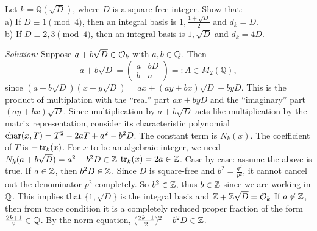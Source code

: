 \begin{outline}
    
    \begin{exercise}
        Let $k = \mathbb{Q}(\sqrt{D})$, where $D$ is a square-free integer. Show that:\\
        a) If $D \equiv 1 \pmod{4}$, then an integral basis is ${1, \frac{1+\sqrt{D}}{2}}$ and $d_k = D$.\\
        b) If $D \equiv 2,3 \pmod{4}$, then an integral basis is ${1, \sqrt{D}}$ and $d_k = 4D$.
    \end{exercise}
    \textit{Solution:} 
        \1 Suppose $a+b\sqrt{D} \in \mathcal{O}_k$ with $a,b\in \mathbb{Q}$. Then 
        $$a + b\sqrt{D} = \begin{pmatrix} a & bD \\ b & a \end{pmatrix} =:A\in M_2(\mathbb{Q}),$$
        since $(a+b\sqrt{D})(x+y\sqrt{D})=ax+(ay+bx)\sqrt{D}+byD$. This is the product of multiplation with the \enquote{real} part $ax+byD$ and the \enquote{imaginary} part $(ay+bx)\sqrt{D}$. 
        \1 Since multiplication by $a+b\sqrt{D}$ acts like multiplication by the matrix representation, consider its characteristic polynomial $\operatorname{char}(x,T)=T^2-2aT+a^2-b^2D$.
            \2 The constant term is $N_k(x)$.
            \2 The coefficient of $T$ is $-\operatorname{tr}_k(x)$.
        \1 For $x$ to be an algebraic integer, we need 
            \2 $N_k(a+b\sqrt{D})=a^2-b^2D\in \mathbb{Z}$ 
            \2 $\operatorname{tr}_k(x)=2a\in \mathbb{Z}$.
        \1 Case-by-case: assume the above is true.
            \2 If $a\in\mathbb{Z}$, then $b^2D \in\mathbb{Z}$. Since $D$ is square-free and $b^2=\frac{q^2}{p^2}$, it cannot cancel out the denominator $p^2$ completely. So $b^2 \in \mathbb{Z}$, thus $b\in\mathbb{Z}$ since we are working in $\mathbb{Q}$. This implies that $\{1,\sqrt{D}\}$ is the integral basis and $\mathbb{Z} + \mathbb{Z}\sqrt{D}=\mathcal{O}_k$
            \2 If $a\not\in\mathbb{Z}$, then from trace condition it is a completely reduced proper fraction of the form $\frac{2k+1}{2}\in\mathbb{Q}$. By the norm equation, $(\frac{2k+1}{2})^2-b^2D \in\mathbb{Z}$.

\end{outline}
